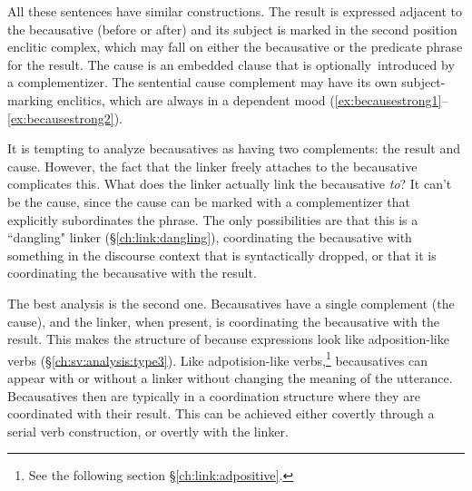 All these sentences have similar constructions. The result is expressed adjacent to the becausative (before or after) and its subject is marked in the second position enclitic complex, which may fall on either the becausative or the predicate phrase for the result. The cause is an embedded clause that is optionally introduced by a complementizer. The sentential cause complement may have its own subject-marking enclitics, which are always in a dependent mood (\ref{ex:becausestrong1}--\ref{ex:becausestrong2}).

It is tempting to analyze becausatives as having two complements: the result and cause. However, the fact that the linker freely attaches to the becausative complicates this. What does the linker actually link the becausative \textit{to}? It can't be the cause, since the cause can be marked with a complementizer that explicitly subordinates the phrase. The only possibilities are that this is a ``dangling" linker (\S\ref{ch:link:dangling}), coordinating the becausative with something in the discourse context that is syntactically dropped, or that it is coordinating the becausative with the result.

The best analysis is the second one. Becausatives have a single complement (the cause), and the linker, when present, is coordinating the becausative with the result. This makes the structure of because expressions look like adposition-like verbs (\S\ref{ch:sv:analysis:type3}). Like adpotision-like verbs,\footnote{See the following section \S\ref{ch:link:adpositive}.} becausatives can appear with or without a linker without changing the meaning of the utterance. Becausatives then are typically in a coordination structure where they are coordinated with their result. This can be achieved either covertly through a serial verb construction, or overtly with the linker.



